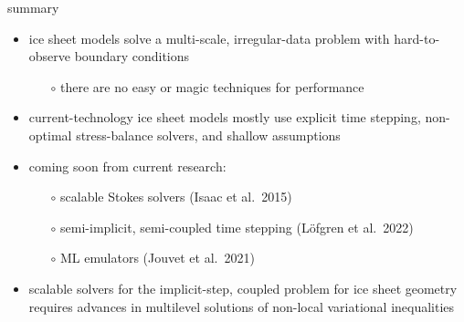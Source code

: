 \documentclass[svgnames,
               hyperref={colorlinks,citecolor=DeepPink4,linkcolor=FireBrick,urlcolor=Maroon},
               usepdftitle=false]  %
               {beamer}
\begin{document}
\begin{frame}{\alert{summary}}

\begin{itemize}
\item ice sheet models solve a multi-scale, irregular-data problem with hard-to-observe boundary conditions
   \begin{itemize}
   \item[$\circ$] there are \alert{no easy or magic techniques} for performance
   \end{itemize}
\item current-technology ice sheet models mostly use \alert{explicit time stepping}, \alert{non-optimal stress-balance solvers}, and shallow assumptions
\item \alert{coming soon} from current research:
   \begin{itemize}
   \item[$\circ$] scalable Stokes solvers (Isaac et al.~2015)
   \item[$\circ$] semi-implicit, semi-coupled time stepping (L{\"o}fgren et al.~2022)
   \item[$\circ$] ML emulators (Jouvet et al.~2021)
   \end{itemize}
\item scalable solvers for the implicit-step, coupled problem for ice sheet geometry requires advances in \alert{multilevel solutions of non-local variational inequalities}
\end{itemize}
\end{frame}
\end{document}
